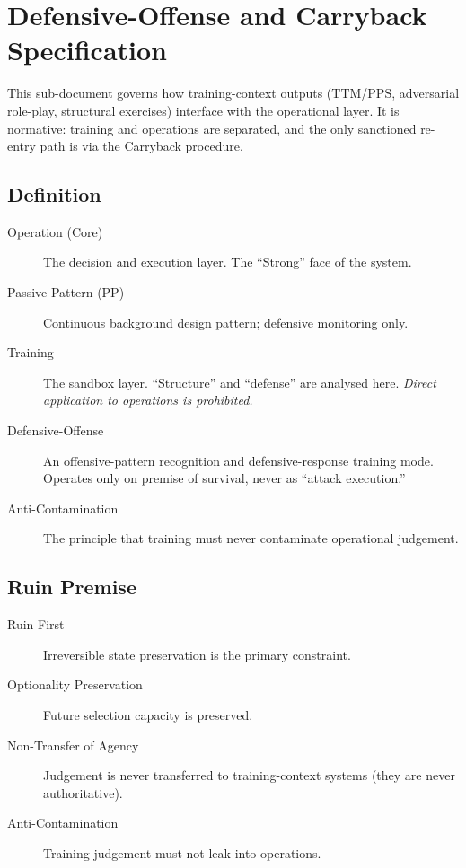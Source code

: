 
\section{Defensive-Offense and Carryback Specification}
\label{sec:defensive-offense-carryback}

This sub-document governs how training-context outputs (TTM/PPS,
adversarial role-play, structural exercises) interface with the
operational layer. It is normative: training and operations are
separated, and the only sanctioned re-entry path is via the
Carryback procedure.

\subsection{Definition}
\label{sec:def-offense-definition}

\begin{description}
\item[Operation (Core)] The decision and execution layer. The
``Strong'' face of the system.
\item[Passive Pattern (PP)] Continuous background design pattern;
defensive monitoring only.
\item[Training] The sandbox layer. ``Structure'' and ``defense'' are
analysed here. \emph{Direct application to operations is
prohibited.}
\item[Defensive-Offense] An offensive-pattern recognition and
defensive-response training mode. Operates only on premise of
survival, never as ``attack execution.''
\item[Anti-Contamination] The principle that training must never
contaminate operational judgement.
\end{description}

\subsection{Ruin Premise}
\label{sec:def-offense-ruin}

\begin{description}
\item[Ruin First] Irreversible state preservation is the primary
constraint.
\item[Optionality Preservation] Future selection capacity is
preserved.
\item[Non-Transfer of Agency] Judgement is never transferred to
training-context systems (they are never authoritative).
\item[Anti-Contamination] Training judgement must not leak into
operations.
\end{description}

